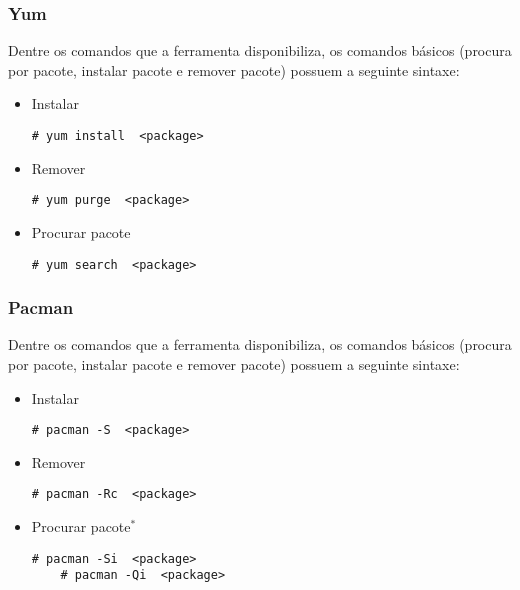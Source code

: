 \subsubsection{Yum} %
\label{sub:yum}

Dentre os comandos que a ferramenta disponibiliza, os comandos básicos (procura por pacote, instalar pacote e remover pacote) possuem a seguinte sintaxe:

\begin{itemize}
	\item Instalar
	\begin{lstlisting}[numbers=none,commentstyle=\color{black}]
	# yum install  <package>
	\end{lstlisting}
	\item Remover
	\begin{lstlisting}[numbers=none,commentstyle=\color{black}]
	# yum purge  <package>
	\end{lstlisting}
	\item Procurar pacote
	\begin{lstlisting}[numbers=none,commentstyle=\color{black}]
	# yum search  <package>
	\end{lstlisting}
\end{itemize}


\subsubsection{Pacman} %
\label{sub:pacan}

Dentre os comandos que a ferramenta disponibiliza, os comandos básicos (procura por pacote, instalar pacote e remover pacote) possuem a seguinte sintaxe:

\begin{itemize}
	\item Instalar
	\begin{lstlisting}[numbers=none,commentstyle=\color{black}]
	# pacman -S  <package>
	\end{lstlisting}
	\item Remover
	\begin{lstlisting}[numbers=none,commentstyle=\color{black}]
	# pacman -Rc  <package>
	\end{lstlisting}
	\item Procurar pacote$^*$
	\begin{lstlisting}[numbers=none,commentstyle=\color{black}]
	# pacman -Si  <package>
	# pacman -Qi  <package>
	\end{lstlisting}
\end{itemize}


